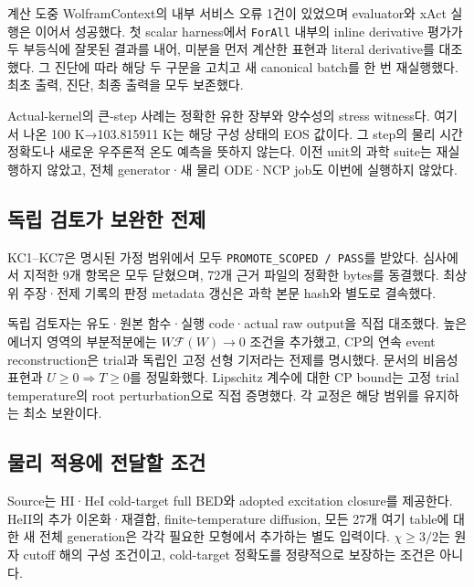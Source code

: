 \documentclass[11pt,a4paper]{article}
\begin{document}
계산 도중 WolframContext의 내부 서비스 오류 1건이 있었으며 evaluator와 xAct 실행은 이어서 성공했다. 첫 scalar harness에서 \texttt{ForAll} 내부의 inline derivative 평가가 두 부등식에 잘못된 결과를 내어, 미분을 먼저 계산한 표현과 literal derivative를 대조했다. 그 진단에 따라 해당 두 구문을 고치고 새 canonical batch를 한 번 재실행했다. 최초 출력, 진단, 최종 출력을 모두 보존했다.

Actual-kernel의 큰-step 사례는 정확한 유한 장부와 양수성의 stress witness다. 여기서 나온 100 K→103.815911 K는 해당 구성 상태의 EOS 값이다. 그 step의 물리 시간 정확도나 새로운 우주론적 온도 예측을 뜻하지 않는다. 이전 unit의 과학 suite는 재실행하지 않았고, 전체 generator·새 물리 ODE·NCP job도 이번에 실행하지 않았다.

\hypertarget{uxb3c5uxb9bd-uxac80uxd1a0uxac00-uxbcf4uxc644uxd55c-uxc804uxc81c}{%
\subsection{독립 검토가 보완한 전제}\label{uxb3c5uxb9bd-uxac80uxd1a0uxac00-uxbcf4uxc644uxd55c-uxc804uxc81c}}

KC1--KC7은 명시된 가정 범위에서 모두 \texttt{PROMOTE\_SCOPED\ /\ PASS}를 받았다. 심사에서 지적한 9개 항목은 모두 닫혔으며, 72개 근거 파일의 정확한 bytes를 동결했다. 최상위 주장·전제 기록의 판정 metadata 갱신은 과학 본문 hash와 별도로 결속했다.

독립 검토자는 유도·원본 함수·실행 code·actual raw output을 직접 대조했다. 높은 에너지 영역의 부분적분에는 \(W\mathcal F(W)\to0\) 조건을 추가했고, CP의 연속 event reconstruction은 trial과 독립인 고정 선형 기저라는 전제를 명시했다. 문서의 비음성 표현과 \(U\ge0\Rightarrow T\ge0\)를 정밀화했다. Lipschitz 계수에 대한 CP bound는 고정 trial temperature의 root perturbation으로 직접 증명했다. 각 교정은 해당 범위를 유지하는 최소 보완이다.

\hypertarget{uxbb3cuxb9ac-uxc801uxc6a9uxc5d0-uxc804uxb2ecuxd560-uxc870uxac74}{%
\subsection{물리 적용에 전달할 조건}\label{uxbb3cuxb9ac-uxc801uxc6a9uxc5d0-uxc804uxb2ecuxd560-uxc870uxac74}}

Source는 HI·HeI cold-target full BED와 adopted excitation closure를 제공한다. HeII의 추가 이온화·재결합, finite-temperature diffusion, 모든 27개 여기 table에 대한 새 전체 generation은 각각 필요한 모형에서 추가하는 별도 입력이다. \(\chi\ge3/2\)는 원자 cutoff 해의 구성 조건이고, cold-target 정확도를 정량적으로 보장하는 조건은 아니다.
\end{document}
